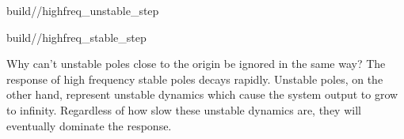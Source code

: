 \begin{bookfigure}
  \begin{minisvg}{2}{build/\chapterpath/highfreq_unstable_step}
    \caption{Step response of second-order DC brushed motor plant}
    \label{fig:highfreq_unstable_step}
  \end{minisvg}
  \hfill
  \begin{minisvg}{2}{build/\chapterpath/highfreq_stable_step}
    \caption{Step response of first-order DC brushed motor plant}
    \label{fig:highfreq_stable_step}
  \end{minisvg}
\end{bookfigure}

Why can't unstable poles close to the origin be ignored in the same way? The
response of high frequency stable poles decays rapidly. Unstable poles, on the
other hand, represent unstable dynamics which cause the \gls{system}
\gls{output} to grow to infinity. Regardless of how slow these unstable dynamics
are, they will eventually dominate the response.
